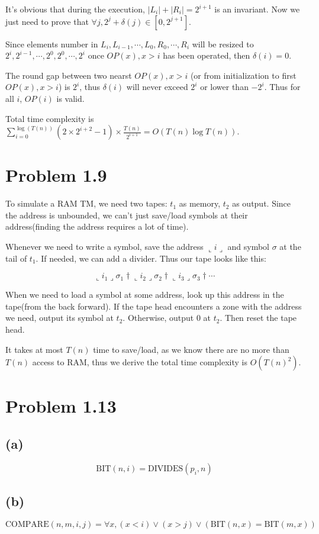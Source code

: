 \documentclass[paper=a4, fontsize=11pt]{scrartcl} %
\numberwithin{equation}{section} %
\numberwithin{figure}{section} %
\numberwithin{table}{section} %
\begin{document}
It's obvious that during the execution, $|L_i| + |R_i| = 2^{i+1}$ is an invariant. Now we just need to prove that $\forall j, 2^{j} + \delta(j) \in [0, 2^{j+1}]$. 

Since elements number in $L_i, L_{i-1}, \cdots, L_{0}, R_{0}, \cdots, R_i$ will be resized to $2^i, 2^{i-1}, \cdots, 2^{0}, 2^{0}, \cdots, 2^i$ once $OP(x), x>i$ has been operated, then $\delta(i) = 0$.

The round gap between two nearst $OP(x), x > i$ (or from initialization to first $OP(x), x > i$) is $2^i$, thus $\delta(i)$ will never exceed $2^{i}$ or lower than $-2^{i}$. Thus for all $i$, $OP(i)$ is valid.

Total time complexity is $\sum\limits_{i=0}^{\log(T(n))} (2\times 2^{i+2} - 1) \times \frac{T(n)}{2^{i+1}} = O(T(n)\log T(n))$.

\section*{Problem 1.9}
To simulate a RAM TM, we need two tapes: $t_1$ as memory, $t_2$ as output. Since the address is unbounded, we can't just save/load symbols at their address(finding the address requires a lot of time). 

Whenever we need to write a symbol, save the address $\llcorner i \lrcorner$ and symbol $\sigma$ at the tail of $t_1$. If needed, we can add a divider. Thus our tape looks like this:

$$\llcorner i_1 \lrcorner \sigma_1 \dag \llcorner i_2 \lrcorner \sigma_2 \dag \llcorner i_3 \lrcorner \sigma_3 \dag \cdots $$

When we need to load a symbol at some address, look up this address in the tape(from the back forward). If the tape head encounters a zone with the address we need, output its symbol at $t_2$. Otherwise, output $0$ at $t_2$. Then reset the tape head.

It takes at most $T(n)$ time to save/load, as we know there are no more than $T(n)$ access to RAM, thus we derive the total time complexity is $O(T(n)^2)$.

\section*{Problem 1.13}
\subsection*{(a)}
$$\textrm{BIT}(n, i) = \textrm{DIVIDES}(p_i, n) $$
\subsection*{(b)}
$$\textrm{COMPARE}(n, m, i, j) = \forall x, (x < i) \vee (x > j) \vee \left(\textrm{BIT}(n, x) = \textrm{BIT}(m, x)\right) $$
\end{document}
